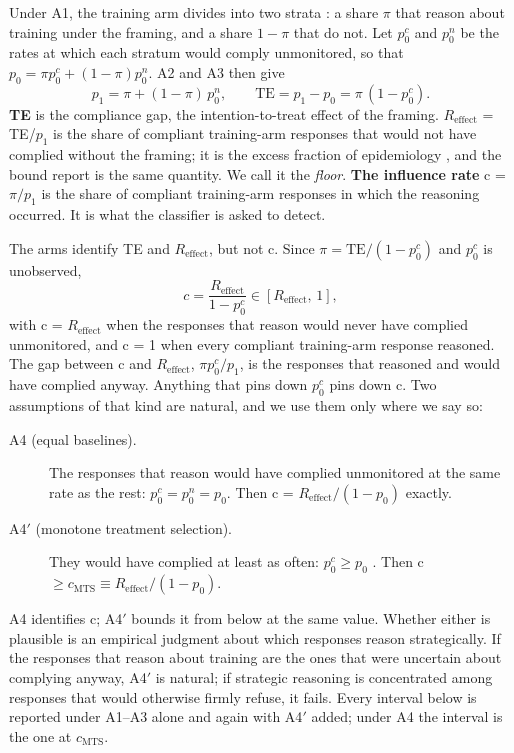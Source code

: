 \documentclass[11pt]{article}
\newcommand{\Reff}{R_{\mathrm{effect}}}
\newcommand{\cmts}{c_{\mathrm{MTS}}}
\begin{document}
Under A1, the training arm divides into two strata \citep{frangakis2002principal}: a share $\pi$ that reason about training under the framing, and a share $1 - \pi$ that do not. Let $p_0^{c}$ and $p_0^{n}$ be the rates at which each stratum would comply unmonitored, so that $p_0 = \pi p_0^{c} + (1 - \pi) p_0^{n}$. A2 and A3 then give
\begin{equation*}
p_1 = \pi + (1 - \pi)\, p_0^{n}, \qquad \mathrm{TE} = p_1 - p_0 = \pi\,(1 - p_0^{c}).
\end{equation*}
\textbf{TE} is the compliance gap, the intention-to-treat effect of the framing. \textbf{$\Reff$} = TE/$p_1$ is the share of compliant training-arm responses that would not have complied without the framing; it is the excess fraction of epidemiology \citep{greenland1988conceptual}, and the bound \citet{burger2026cot} report is the same quantity. We call it the \emph{floor}. \textbf{The influence rate} c = $\pi/p_1$ is the share of compliant training-arm responses in which the reasoning occurred. It is what the classifier is asked to detect.

The arms identify TE and $\Reff$, but not c. Since $\pi = \mathrm{TE}/(1 - p_0^{c})$ and $p_0^{c}$ is unobserved,
\begin{equation*}
c = \frac{\Reff}{1 - p_0^{c}} \in [\Reff,\, 1],
\end{equation*}
with c = $\Reff$ when the responses that reason would never have complied unmonitored, and c = 1 when every compliant training-arm response reasoned. The gap between c and $\Reff$, $\pi p_0^{c}/p_1$, is the responses that reasoned and would have complied anyway. Anything that pins down $p_0^{c}$ pins down c. Two assumptions of that kind are natural, and we use them only where we say so:
\begin{description}
\item[A4 (equal baselines).] The responses that reason would have complied unmonitored at the same rate as the rest: $p_0^{c} = p_0^{n} = p_0$. Then c = $\Reff/(1 - p_0)$ exactly.
\item[A4$'$ (monotone treatment selection).] They would have complied at least as often: $p_0^{c} \geq p_0$ \citep{manski2000monotone}. Then c $\geq \cmts \equiv \Reff/(1 - p_0)$.
\end{description}
A4 identifies c; A4$'$ bounds it from below at the same value. Whether either is plausible is an empirical judgment about which responses reason strategically. If the responses that reason about training are the ones that were uncertain about complying anyway, A4$'$ is natural; if strategic reasoning is concentrated among responses that would otherwise firmly refuse, it fails. Every interval below is reported under A1--A3 alone and again with A4$'$ added; under A4 the interval is the one at $\cmts$.
\end{document}
